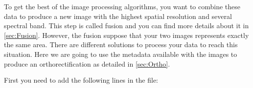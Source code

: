 To get the best of the image processing algorithms, you want to combine these data to produce a new image with the highest spatial resolution and several spectral band. This step is called fusion and you can find more details about it in \ref{sec:Fusion}. However, the fusion suppose that your two images represents exactly the same area. There are different solutions to process your data to reach this situation. Here we are going to use the metadata available with the images to produce an orthorectification as detailed in \ref{sec:Ortho}.

First you need to add the following lines in the  file:






%
%
%



